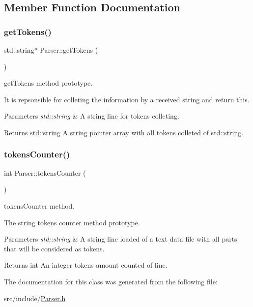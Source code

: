 \subsection{Member Function Documentation}
\mbox{\label{classParser_a0182d00abdc54e826dd081b4a0246c3c}} 
\subsubsection{\texorpdfstring{get\+Tokens()}{getTokens()}}
{\footnotesize\ttfamily std\+::string$\ast$ Parser\+::get\+Tokens (\begin{DoxyParamCaption}\item[{std\+::string}]{ }\end{DoxyParamCaption})}



get\+Tokens method prototype. 

It is repsonsible for colleting the information by a received string and return this.


\begin{DoxyParams}{Parameters}
{\em std\+::string} & A string line for tokens colleting. \\
\hline
\end{DoxyParams}
\begin{DoxyReturn}{Returns}
std\+::string A string pointer array with all tokens colleted of std\+::string. 
\end{DoxyReturn}
\mbox{\label{classParser_a985b182e8f0852e2b68999f7266753d9}} 
\subsubsection{\texorpdfstring{tokens\+Counter()}{tokensCounter()}}
{\footnotesize\ttfamily int Parser\+::tokens\+Counter (\begin{DoxyParamCaption}\item[{std\+::string}]{ }\end{DoxyParamCaption})}



tokens\+Counter method. 

The string tokens counter method prototype.


\begin{DoxyParams}{Parameters}
{\em std\+::string} & A string line loaded of a text data file with all parts that will be considered as tokens. \\
\hline
\end{DoxyParams}
\begin{DoxyReturn}{Returns}
int An integer tokens amount counted of line. 
\end{DoxyReturn}


The documentation for this class was generated from the following file\+:\begin{DoxyCompactItemize}
\item 
src/include/\hyperlink{Parser_8h}{Parser.\+h}\end{DoxyCompactItemize}
